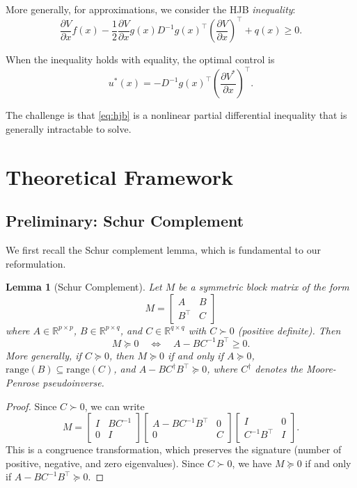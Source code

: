\documentclass[11pt]{article}
\newtheorem{lemma}[theorem]{Lemma}
\newcommand{\real}{\mathbb{R}}
\begin{document}
More generally, for approximations, we consider the HJB \emph{inequality}:
\begin{equation}
\frac{\partial V}{\partial x}f(x) - \frac{1}{2}\frac{\partial V}{\partial x}g(x)D^{-1}g(x)^\top\left(\frac{\partial V}{\partial x}\right)^\top + q(x) \geq 0.
\label{eq:hjb}
\end{equation}

When the inequality holds with equality, the optimal control is
\begin{equation}
u^*(x) = -D^{-1}g(x)^\top \left(\frac{\partial V^*}{\partial x}\right)^\top.
\label{eq:optimal_control}
\end{equation}

The challenge is that \eqref{eq:hjb} is a nonlinear partial differential inequality that is generally intractable to solve.

\section{Theoretical Framework}
\label{sec:theory}

\subsection{Preliminary: Schur Complement}

We first recall the Schur complement lemma, which is fundamental to our reformulation.

\begin{lemma}[Schur Complement]
\label{lem:schur}
Let $M$ be a symmetric block matrix of the form
\[
M = \begin{bmatrix} A & B \\ B^\top & C \end{bmatrix}
\]
where $A \in \real^{p \times p}$, $B \in \real^{p \times q}$, and $C \in \real^{q \times q}$ with $C \succ 0$ (positive definite). Then
\[
M \succeq 0 \quad \Longleftrightarrow \quad A - BC^{-1}B^\top \geq 0.
\]
More generally, if $C \succeq 0$, then $M \succeq 0$ if and only if $A \succeq 0$, $\text{range}(B) \subseteq \text{range}(C)$, and $A - BC^\dagger B^\top \succeq 0$, where $C^\dagger$ denotes the Moore-Penrose pseudoinverse.
\end{lemma}

\begin{proof}
Since $C \succ 0$, we can write
\[
M = \begin{bmatrix} I & BC^{-1} \\ 0 & I \end{bmatrix}
\begin{bmatrix} A - BC^{-1}B^\top & 0 \\ 0 & C \end{bmatrix}
\begin{bmatrix} I & 0 \\ C^{-1}B^\top & I \end{bmatrix}.
\]
This is a congruence transformation, which preserves the signature (number of positive, negative, and zero eigenvalues). Since $C \succ 0$, we have $M \succeq 0$ if and only if $A - BC^{-1}B^\top \succeq 0$.
\end{proof}
\end{document}
